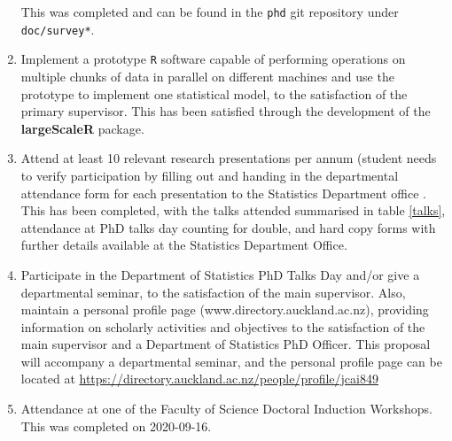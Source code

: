 \begin{enumerate}
                This was completed and can be found in the \texttt{phd} git repository under \texttt{doc/survey*}.
	\item Implement a prototype \texttt{R} software capable of performing operations on multiple chunks of data in parallel on different machines and use the prototype to implement one statistical model, to the satisfaction of the primary supervisor.
                This has been satisfied through the development of the \textbf{largeScaleR} package.
        \item Attend at least 10 relevant research presentations per annum (student needs to verify participation by filling out and handing in the departmental attendance form for each presentation to the Statistics Department office    .
                This has been completed, with the talks attended summarised in table \ref{talks}, attendance at PhD talks day counting for double, and hard copy forms with further details available at the Statistics Department Office.
        \item Participate in the Department of Statistics PhD Talks Day and/or give a departmental seminar, to the satisfaction of the main supervisor.
                Also, maintain a personal profile page (www.directory.auckland.ac.nz), providing information on scholarly activities and objectives to the satisfaction of the main supervisor and a Department of Statistics PhD Officer.
                This proposal will accompany a departmental seminar, and the personal profile page can be located at \url{https://directory.auckland.ac.nz/people/profile/jcai849}
        \item Attendance at one of the Faculty of Science Doctoral Induction Workshops.
                This was completed  on 2020-09-16.
\end{enumerate}

